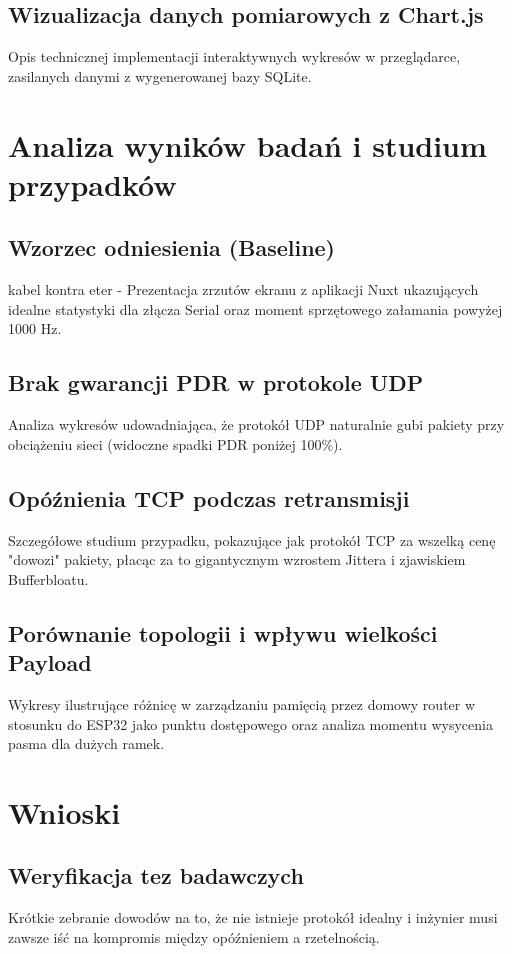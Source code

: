 \section{Wizualizacja danych pomiarowych z Chart.js}
Opis technicznej implementacji interaktywnych wykresów w przeglądarce, zasilanych danymi z wygenerowanej bazy SQLite.

\chapter{Analiza wyników badań i studium przypadków}

\section{Wzorzec odniesienia (Baseline)}
kabel kontra eter - Prezentacja zrzutów ekranu z aplikacji Nuxt ukazujących idealne statystyki dla złącza Serial oraz moment sprzętowego załamania powyżej 1000 Hz.

\section{Brak gwarancji PDR w protokole UDP}
Analiza wykresów udowadniająca, że protokół UDP naturalnie gubi pakiety przy obciążeniu sieci (widoczne spadki PDR poniżej 100\%).

\section{Opóźnienia TCP podczas retransmisji}
Szczegółowe studium przypadku, pokazujące jak protokół TCP za wszelką cenę "dowozi" pakiety, płacąc za to gigantycznym wzrostem Jittera i zjawiskiem Bufferbloatu.

\section{Porównanie topologii i wpływu wielkości Payload}
Wykresy ilustrujące różnicę w zarządzaniu pamięcią przez domowy router w stosunku do ESP32 jako punktu dostępowego oraz analiza momentu wysycenia pasma dla dużych ramek.

\chapter{Wnioski}

\section{Weryfikacja tez badawczych}
Krótkie zebranie dowodów na to, że nie istnieje protokół idealny i inżynier musi zawsze iść na kompromis między opóźnieniem a rzetelnością.

